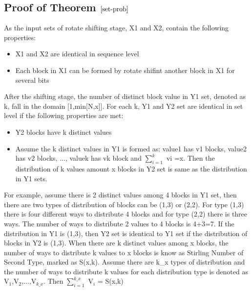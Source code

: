\documentclass{article}
\begin{document}
\subsection{Proof of Theorem $\ref{set-prob}$}
As the input sets of rotate shifting stage, X1 and X2, contain the following properties:
\begin{itemize}
	\item X1 and X2 are identical in sequence level
	\item Each block in X1 can be formed by rotate shifint another block in X1 for several bits
\end{itemize}
After the shifting stage, the number of distinct block value in Y1 set, denoted as k, fall in the domain [1,min[N,x]]. For each k, Y1 and Y2 set are identical in set level if the following properties are met:
\begin{itemize}
	\item Y2 blocks have k distinct values 
	\item Assume the k distinct values in Y1 is formed as: value1 has v1 blocks, value2 has v2 blocks, $\ldots$, valuek has vk block and $\sum_{i=1}^k$ vi =x. Then the distribution of k values amount x blocks in Y2 set is same as the distribution in Y1 sets. 
\end{itemize}
For example, assume there is 2 distinct values among 4 blocks in Y1 set, then there are two types of distribution of blocks can be (1,3) or (2,2). For type (1,3) there is four different ways to distribute 4 blocks and for type (2,2) there is three ways.  The number of ways to distribute 2 values to 4 blocks is 4+3=7. If the distribution in Y1 is (1,3), then Y2 set is identical to Y1 set if the distribution of blocks in Y2 is (1,3). 
When there are k distinct values among x blocks, the number of ways to distribute k values to x blocks is know as Stirling Number of Second Type, marked as S(x,k). Assume there are k\_x types of distribution and the number of ways to distribute k values for each distribution type is denoted as V$_1$,V$_2$,$\ldots$,V$_{k\_x}$. Then $\sum_{i=1}^{k\_x}$ V$_i$ = S(x,k)    
\end{document}

